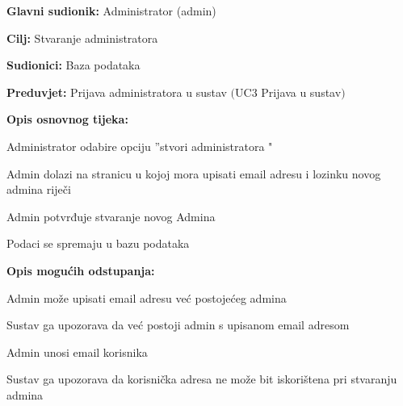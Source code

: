 \noindent {}
\begin{packed_item}

	\item \textbf{Glavni sudionik:} Administrator (admin)
	\item  \textbf{Cilj:} Stvaranje administratora
	\item  \textbf{Sudionici:} Baza podataka
	\item  \textbf{Preduvjet:} Prijava administratora u sustav $($UC3 Prijava u sustav$)$
	\item  \textbf{Opis osnovnog tijeka:}
	
	\item[] \begin{packed_enum}

		\item Administrator odabire opciju ”stvori administratora "
		\item Admin dolazi na stranicu u kojoj mora upisati email adresu i lozinku novog admina riječi
		\item Admin potvrđuje stvaranje novog Admina
		\item Podaci se spremaju u bazu podataka
	\end{packed_enum}
	
	\item  \textbf{Opis mogućih odstupanja:}
	
	\item[] \begin{packed_item}

		\item[2.a] Admin može upisati email adresu već postojećeg admina
		\item[] \begin{packed_enum}
			
			\item Sustav ga upozorava da već postoji admin s upisanom email adresom							
		\end{packed_enum}

		\item[2.b] Admin unosi email korisnika
		\item[] \begin{packed_enum}
			
			\item Sustav ga upozorava da korisnička adresa ne može bit iskorištena pri stvaranju admina								
		\end{packed_enum}
		
	\end{packed_item}
\end{packed_item}

